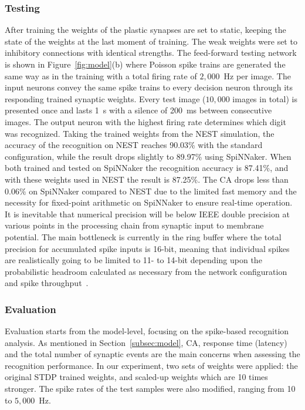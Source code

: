 \documentclass{frontiersENG} %
\begin{document}
\subsubsection{Testing}
After training the weights of the plastic synapses are set to static, keeping the state of the weights at the last moment of training.
The weak weights were set to inhibitory connections with identical strengths.
The feed-forward testing network is shown in Figure~\ref{fig:model}(b) where Poisson spike trains are generated the same way as in the training with a total firing rate of $2,000$~Hz per image.
The input neurons convey the same spike trains to every decision neuron through its responding trained synaptic weights. 
Every test image ($10,000$ images in total) is presented once and lasts 1~s with a silence of 200~ms between consecutive images.
The output neuron with the highest firing rate determines which digit was recognized.
Taking the trained weights from the NEST simulation, the accuracy of the recognition on NEST reaches 90.03\% with the standard configuration, while the result drops slightly to 89.97\% using SpiNNaker.
When both trained and tested on SpiNNaker the recognition accuracy is 87.41\%, and with these weights used in NEST the result is 87.25\%. 
The CA drops less than $0.06\%$ on SpiNNaker compared to NEST due to the limited fast memory and the necessity for fixed-point arithmetic on SpiNNaker to ensure real-time operation.
It is inevitable that numerical precision will be below IEEE double precision at various points in the processing chain from synaptic input to membrane potential.
The main bottleneck is currently in the ring buffer where the total precision for accumulated spike inputs is 16-bit, meaning that individual spikes are realistically going to be limited to 11- to 14-bit depending upon the probabilistic headroom calculated as necessary from the network configuration and spike throughput~\citep{Hopkins2015Accuracy}.

\subsubsection{Evaluation}
Evaluation starts from the model-level, focusing on the spike-based recognition analysis.
As mentioned in Section~\ref{subsec:model}, CA, response time (latency) and the total number of synaptic events are the main concerns when assessing the recognition performance.
In our experiment, two sets of weights were applied: the original STDP trained weights, and scaled-up weights which are 10 times stronger.
The spike rates of the test samples were also modified, ranging from 10 to $5,000$~Hz.
\end{document}
